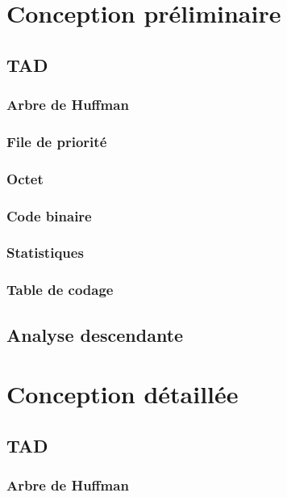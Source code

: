 \documentclass[12pt,a4paper]{article}
\begin{document}
\newpage

\section{Conception préliminaire}
\subsection{TAD}
\subsubsection{Arbre de Huffman}

\subsubsection{File de priorité}

\subsubsection{Octet}

\subsubsection{Code binaire}

\subsubsection{Statistiques}

\subsubsection{Table de codage}

\subsection{Analyse descendante}


\newpage

\section{Conception détaillée}
\subsection{TAD}
\subsubsection{Arbre de Huffman}

\end{document}
